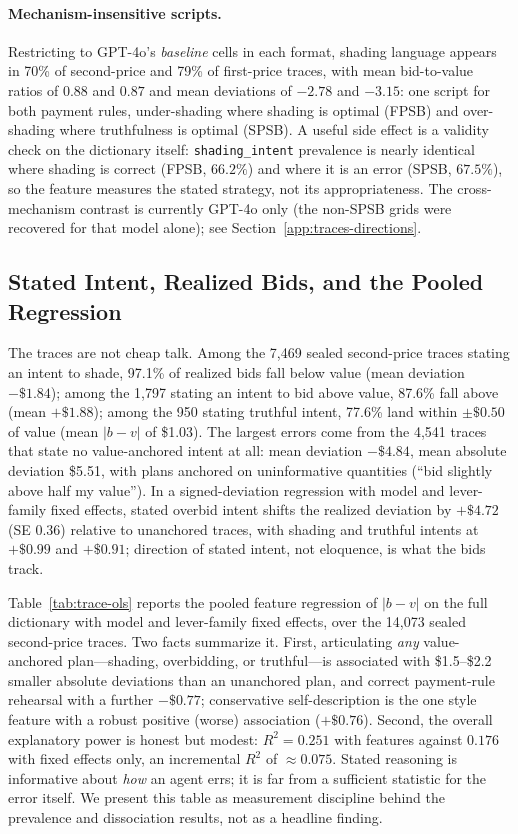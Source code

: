 \paragraph{Mechanism-insensitive scripts.} Restricting to GPT-4o's \emph{baseline} cells in each format, shading language appears in 70\% of second-price and 79\% of first-price traces, with mean bid-to-value ratios of $0.88$ and $0.87$ and mean deviations of $-2.78$ and $-3.15$: one script for both payment rules, under-shading where shading is optimal (FPSB) and over-shading where truthfulness is optimal (SPSB). A useful side effect is a validity check on the dictionary itself: \texttt{shading\_intent} prevalence is nearly identical where shading is correct (FPSB, $66.2\%$) and where it is an error (SPSB, $67.5\%$), so the feature measures the stated strategy, not its appropriateness. The cross-mechanism contrast is currently GPT-4o only (the non-SPSB grids were recovered for that model alone); see Section~\ref{app:traces-directions}.

\subsection{Stated Intent, Realized Bids, and the Pooled Regression}\label{app:traces-ols}

The traces are not cheap talk. Among the 7{,}469 sealed second-price traces stating an intent to shade, 97.1\% of realized bids fall below value (mean deviation $-\$1.84$); among the 1{,}797 stating an intent to bid above value, 87.6\% fall above (mean $+\$1.88$); among the 950 stating truthful intent, 77.6\% land within $\pm\$0.50$ of value (mean $|b-v|$ of \$1.03). The largest errors come from the 4{,}541 traces that state no value-anchored intent at all: mean deviation $-\$4.84$, mean absolute deviation \$5.51, with plans anchored on uninformative quantities (``bid slightly above half my value''). In a signed-deviation regression with model and lever-family fixed effects, stated overbid intent shifts the realized deviation by $+\$4.72$ (SE $0.36$) relative to unanchored traces, with shading and truthful intents at $+\$0.99$ and $+\$0.91$; direction of stated intent, not eloquence, is what the bids track.

Table~\ref{tab:trace-ols} reports the pooled feature regression of $|b-v|$ on the full dictionary with model and lever-family fixed effects, over the 14{,}073 sealed second-price traces. Two facts summarize it. First, articulating \emph{any} value-anchored plan---shading, overbidding, or truthful---is associated with \$1.5--\$2.2 smaller absolute deviations than an unanchored plan, and correct payment-rule rehearsal with a further $-\$0.77$; conservative self-description is the one style feature with a robust positive (worse) association ($+\$0.76$). Second, the overall explanatory power is honest but modest: $R^{2} = 0.251$ with features against $0.176$ with fixed effects only, an incremental $R^{2}$ of $\approx 0.075$. Stated reasoning is informative about \emph{how} an agent errs; it is far from a sufficient statistic for the error itself. We present this table as measurement discipline behind the prevalence and dissociation results, not as a headline finding.

